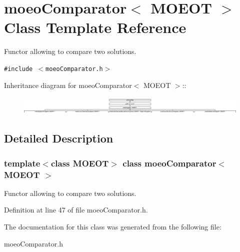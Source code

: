 \section{moeo\-Comparator$<$ MOEOT $>$ Class Template Reference}
\label{classmoeoComparator}
Functor allowing to compare two solutions.  


{\tt \#include $<$moeo\-Comparator.h$>$}

Inheritance diagram for moeo\-Comparator$<$ MOEOT $>$::\begin{figure}[H]
\begin{center}
\leavevmode
\includegraphics[height=0.903226cm]{classmoeoComparator}
\end{center}
\end{figure}


\subsection{Detailed Description}
\subsubsection*{template$<$class MOEOT$>$ class moeo\-Comparator$<$ MOEOT $>$}

Functor allowing to compare two solutions. 



Definition at line 47 of file moeo\-Comparator.h.

The documentation for this class was generated from the following file:\begin{CompactItemize}
\item 
moeo\-Comparator.h\end{CompactItemize}
